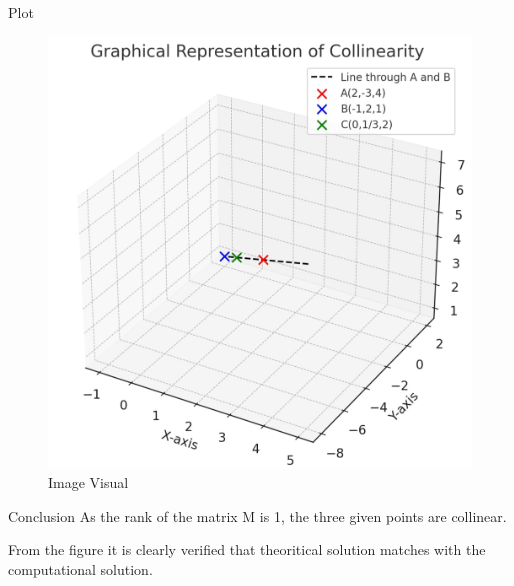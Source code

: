 \documentclass{beamer}
\begin{document}
\begin{frame}{Plot}
   \begin{figure}[H]
    \centering
    \includegraphics[width=0.6\linewidth]{figs/image.png}
    \caption{Image Visual}
    \label{fig:figs/image.png}
\end{figure}
\end{frame}
\begin{frame}{Conclusion}
    As the rank of the matrix M is 1, the three given points are collinear.

From the figure it is clearly verified that theoritical solution matches with the computational solution.
\end{frame}
\end{document}
